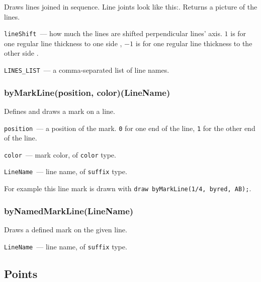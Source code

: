 	Draws lines joined in sequence. Line joints look like this:\drawCurrentPicture. Returns a picture of the lines.
	
	\texttt{lineShift}~— how much the lines are shifted perpendicular lines' axis. \texttt{$1$} is for one regular line thickness to one side%
	, 
	\texttt{$-1$} is for one regular line thickness to the other side%
	.
	
	\texttt{LINES\_LIST}~— a comma-separated list of line names.
	

\subsubsection{byMarkLine(position, color)(LineName)}\label{byMarkLine}

	
	Defines and draws a mark on a line.
	
	\texttt{position}~— a position of the mark. \texttt{0} for one end of the line, \texttt{1} for the other end of the line.
	
	\texttt{color}~— mark color, of \texttt{color} type.
	
	\texttt{LineName}~— line name, of \texttt{suffix} type.
	
	For example this line mark  is drawn with \texttt{draw byMarkLine(1/4, byred, AB);}.

\subsubsection{byNamedMarkLine(LineName)}

	Draws a defined mark on the given line.
	
	\texttt{LineName}~— line name, of \texttt{suffix} type.
	

\subsection{Points}

